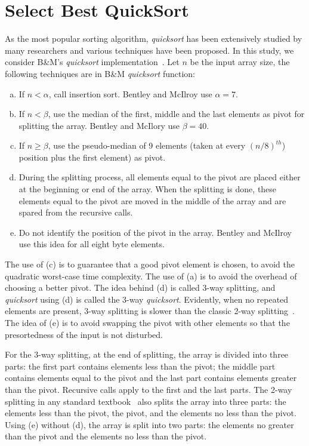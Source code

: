 \documentclass[AMA,STIX1COL]{WileyNJD-v2}
\newcommand{\qusort}{\emph{quicksort }}
\newcommand{\qusortn}{\emph{quicksort}}
\begin{document}
\section{Select Best QuickSort}       
As the most popular sorting algorithm, \qusort has been extensively studied by many researchers and various techniques have been proposed. 
In this study, we consider B\&M’s \qusort implementation~\cite{bentley1993engineering}. 
Let $n$ be the input array size, the following techniques are in B\&M \qusort function: 

\begin{enumerate}[(a)]
\item If $n < \alpha$, call insertion sort. Bentley and McIlroy use $\alpha = 7$.
\item If $n < \beta$, use the median of the first, middle and the last elements as pivot for splitting the array. Bentley and McIlory use $\beta = 40$.
\item If $n \geq \beta$, use the pseudo-median of 9 elements (taken at every $(n/8)^{th}$) position plus the first element) as pivot.
\item During the splitting process, all elements equal to the pivot are placed either at the beginning or end of the array. When the splitting is done, these elements equal to the pivot are moved in the middle of the array and are spared from the recursive calls.
\item Do not identify the position of the pivot in the array. Bentley and McIlroy use this idea for all eight byte elements.
\end{enumerate}

The use of (c) is to guarantee that a good pivot element is chosen, to avoid the quadratic worst-case time complexity.  
The use of (a) is to avoid the overhead of choosing a better pivot. The idea behind (d) is called 3-way splitting, and \qusort using (d) is called the 3-way \qusortn. 
Evidently, when no repeated elements are present, 3-way splitting is slower than the classic 2-way splitting~\cite{10.5555/1614191}. 
The idea of (e) is to avoid swapping the pivot with other elements so that the presortedness of the input is not disturbed. 

For the 3-way splitting, at the end of splitting, the array is divided into three parts: the first part contains elements less than the pivot; the middle part contains elements equal to the pivot and the last part contains elements greater than the pivot. 
Recursive calls apply to the first and the last parts. 
The 2-way splitting in any standard textbook~\cite{10.5555/1614191} also splits the array into three parts: the elements less than the pivot, the pivot, and the elements no less than the pivot. 
Using (e) without (d), the array is split into two parts: the elements no greater than the pivot and the elements no less than the pivot. 
\end{document}
